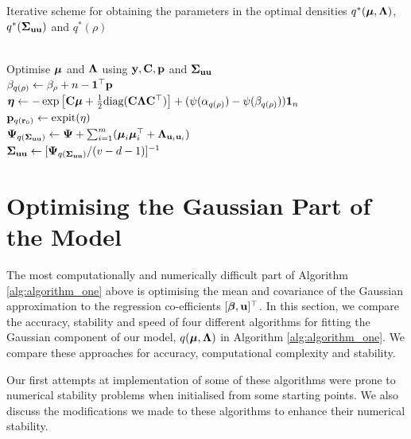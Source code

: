 \begin{algorithm}
	\caption[Algorithm 1]{Iterative scheme for obtaining the parameters in the
		optimal densities $q^*({\boldsymbol \mu}, {\boldsymbol \Lambda})$, $q^*({\boldsymbol \Sigma}_{{\bf u} {\bf u}})$ and $q^*(\rho)$}
	\label{alg:algorithm_one}
	\begin{algorithmic}
		 \\[1ex]
			\STATE Optimise ${\boldsymbol \mu}$ and ${\boldsymbol \Lambda}$ using ${\bf y}, {\bf C}, {\bf p}$ and ${\boldsymbol \Sigma}_{{\bf u} {\bf u}}$ \\[1ex]
			\STATE $\beta_{q(\rho)} \leftarrow \beta_\rho + n - {\bf 1}^\top{\bf p}$ \\[1ex]
            \STATE ${\boldsymbol \eta} \leftarrow -\exp \left [ {\bf C} {\boldsymbol \mu} + \frac{1}{2} \text{diag}{({\bf C}{\boldsymbol\Lambda}{\bf C}^\top)} \right ] + (\psi{(\alpha_{q{(\rho)}})} - \psi{(\beta_{q{(\rho)}})}) {\bf 1}_n$ \\[1ex]
			\STATE ${\bf p}_{q({\bf r}_0)} \leftarrow \text{expit}{(\eta)}$ \\[1ex]
			\STATE ${\boldsymbol \Psi}_{q({\boldsymbol \Sigma}_{{\bf u} {\bf u}})} \leftarrow {\boldsymbol\Psi} + \sum_{i=1}^m ({\boldsymbol \mu}_i {\boldsymbol \mu}_i^\top + {\boldsymbol \Lambda}_{{{\bf u}}_i {{\bf u}}_i})$ \\[1ex]
            \STATE ${\boldsymbol \Sigma}_{{\bf u}{\bf u}} \leftarrow [{\boldsymbol \Psi}_{q({\boldsymbol \Sigma}_{{\bf u} {\bf u}})}/(v - d - 1)]^{-1}$
		\ENDWHILE
	\end{algorithmic}
\end{algorithm}
						
\section{Optimising the Gaussian Part of the Model}
\label{sec:gaussian}

The most computationally and numerically difficult part of Algorithm
\ref{alg:algorithm_one} above is optimising the mean and covariance of the
Gaussian approximation to the regression co-efficients $[{\boldsymbol \beta}, {\bf u}]^\top$. In
this section, we compare the accuracy, stability and speed of four different
algorithms for fitting the Gaussian component of our model, $q({\boldsymbol \mu}, {\boldsymbol \Lambda})$
in Algorithm \ref{alg:algorithm_one}.  We compare these approaches for
accuracy, computational complexity and stability.

Our first attempts at implementation of some of these algorithms were prone to
numerical stability problems when initialised from some starting points. We
also discuss the modifications we made to these algorithms to enhance their
numerical stability.
	
